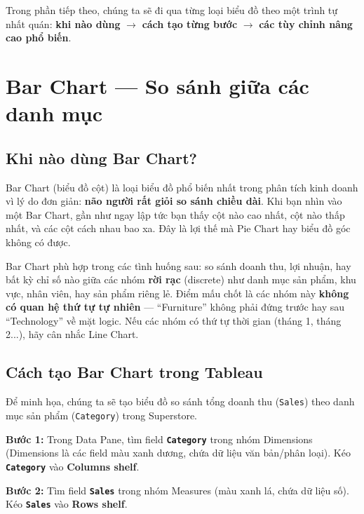 \documentclass[12pt]{article}
\begin{document}
\noindent Trong phần tiếp theo, chúng ta sẽ đi qua từng loại biểu đồ theo một trình tự nhất quán: \textbf{khi nào dùng} $\rightarrow$ \textbf{cách tạo từng bước} $\rightarrow$ \textbf{các tùy chỉnh nâng cao phổ biến}.

\section{Bar Chart --- So sánh giữa các danh mục}

\subsection{Khi nào dùng Bar Chart?}

\noindent Bar Chart (biểu đồ cột) là loại biểu đồ phổ biến nhất trong phân tích kinh doanh vì lý do đơn giản: \textbf{não người rất giỏi so sánh chiều dài}. Khi bạn nhìn vào một Bar Chart, gần như ngay lập tức bạn thấy cột nào cao nhất, cột nào thấp nhất, và các cột cách nhau bao xa. Đây là lợi thế mà Pie Chart hay biểu đồ góc không có được.

\noindent Bar Chart phù hợp trong các tình huống sau: so sánh doanh thu, lợi nhuận, hay bất kỳ chỉ số nào giữa các nhóm \textbf{rời rạc} (discrete) như danh mục sản phẩm, khu vực, nhân viên, hay sản phẩm riêng lẻ. Điểm mấu chốt là các nhóm này \textbf{không có quan hệ thứ tự tự nhiên} --- ``Furniture'' không phải đứng trước hay sau ``Technology'' về mặt logic. Nếu các nhóm có thứ tự thời gian (tháng 1, tháng 2...), hãy cân nhắc Line Chart.

\subsection{Cách tạo Bar Chart trong Tableau}

\noindent Để minh họa, chúng ta sẽ tạo biểu đồ so sánh tổng doanh thu (\texttt{Sales}) theo danh mục sản phẩm (\texttt{Category}) trong Superstore.

\noindent \textbf{Bước 1:} Trong Data Pane, tìm field \textbf{\texttt{Category}} trong nhóm Dimensions (Dimensions là các field màu xanh dương, chứa dữ liệu văn bản/phân loại). Kéo \textbf{\texttt{Category}} vào \textbf{Columns shelf}.

\noindent \textbf{Bước 2:} Tìm field \textbf{\texttt{Sales}} trong nhóm Measures (màu xanh lá, chứa dữ liệu số). Kéo \textbf{\texttt{Sales}} vào \textbf{Rows shelf}.
\end{document}
